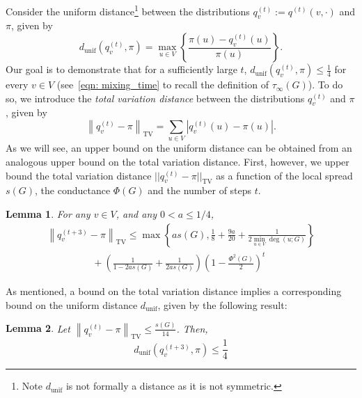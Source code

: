 \documentclass[11pt,twoside]{article}
\newtheorem{lemma}{Lemma}
\newcommand{\set}[1]{\left\{#1\right\}}
\newcommand{\abs}[1]{\left \lvert #1 \right \rvert}
\newcommand{\norm}[1]{\left\lVert#1\right\rVert}
\newcommand{\1}{\mathbf{1}}
\begin{document}
Consider the uniform distance\footnote{Note $d_{\textrm{unif}}$ is not formally a distance as it is not symmetric.} between the distributions $q_v^{(t)} := q^{(t)}(v,\cdot)$ and $\pi$, given by
\begin{equation*}
d_{\textrm{unif}}(q_v^{(t)},\pi) = \max_{u \in V} \set{\frac{\pi(u) - q_v^{(t)}(u)}{\pi(u)}}.
\end{equation*}
Our goal is to demonstrate that for a sufficiently large $t$, $d_{\textrm{unif}}(q_v^{(t)},\pi) \leq \frac{1}{4}$ for every $v \in V$ (see~\eqref{eqn: mixing_time} to recall the definition of $\tau_{\infty}(G)$). To do so, we introduce the \emph{total variation distance} between the distributions $q_v^{(t)}$ and $\pi$, given by
\begin{equation*}
\norm{q_v^{(t)} - \pi}_{\mathrm{TV}} = \sum_{u \in V} \abs{q_v^{(t)}(u) - \pi(u)}.
\end{equation*}
As we will see, an upper bound on the uniform distance can be obtained from an analogous upper bound on the total variation distance. First, however, we upper bound the total variation distance $||q_v^{(t)} - \pi||_{\mathrm{TV}}$ as a function of the local spread $s(G)$, the conductance $\Phi(G)$ and the number of steps $t$.
\begin{lemma}
	\label{lem: tv_mixing_time}
	For any $v \in V$, and any $0 < a \leq 1/4$,
	\begin{align}
	\norm{q_v^{(t + 3)} - \pi}_{\mathrm{TV}} \leq \max\set{as(G), \frac{1}{8} + \frac{9a}{20} + \frac{1}{2 \min_{u \in V} \deg(u;G)}} 
	\nonumber \\
	~~~~~~~~~~~~~~~~~~~~~ + \left(\frac{1}{1 - 2as(G)} +  \frac{1}{2 as(G)}\right) \left(1 - \frac{\Phi^2(G)}{2}\right)^t \label{eqn: tv_mixing_time}
	\end{align}
\end{lemma}

As mentioned, a bound on the total variation distance implies a corresponding bound on the uniform distance $d_{\mathrm{unif}}$, given by the following result:
\begin{lemma}
	\label{lem: tv_to_uniform_distance}
	Let $\norm{q_v^{(t)} - \pi}_{\mathrm{TV}} \leq \frac{s(G)}{14}$. Then,
	\begin{equation*}
	d_{\mathrm{unif}}(q_v^{(t + 3)},\pi) \leq \frac{1}{4}
	\end{equation*}
\end{lemma}
\end{document}
